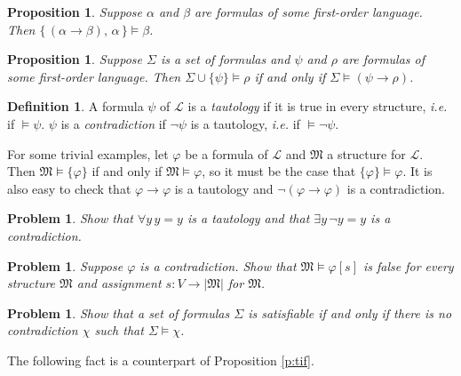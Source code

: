 \documentclass[12pt]{amsbook}
\theoremstyle{plain}
\newtheorem{prop}[thm]{Proposition}
\newtheorem{prob}[thm]{Problem}
\theoremstyle{definition}
\newtheorem{defn}{Definition}[chapter]
\theoremstyle{remark}
\begin{document}
\begin{prop} \label{p:inf}
Suppose $\alpha$ and $\beta$ are formulas of some first-order language.  Then $\{\, (\alpha \to \beta),\,  \alpha\, \} \models \beta$.
\end{prop}

\begin{prop} \label{p:six12}
Suppose $\Sigma$ is a set of formulas and $\psi$ and $\rho$ are formulas of some first-order language.  Then $\Sigma \cup \{\psi\} \models \rho$ if and only if $\Sigma \models (\psi \to \rho)$.
\end{prop}

\begin{defn}
A formula $\psi$ of $\mathcal{L}$ is a {\em tautology\/} if it is true in every structure,  {\em i.e.\/} if $\models \psi$.  $\psi$ is a {\em contradiction\/} if $\lnot \psi$ is a tautology,  {\em i.e.\/} if $\models \lnot \psi$.
\end{defn}

For some trivial examples,  let $\varphi$ be a formula of $\mathcal{L}$ and $\mathfrak{M}$ a structure for $\mathcal{L}$.  Then $\mathfrak{M} \models \{ \varphi \}$ if and only if $\mathfrak{M} \models \varphi$,  so it must be the case that $\{ \varphi \} \models \varphi$.  It is also easy to check that $\varphi \to \varphi$ is a tautology and $\lnot (\varphi \to \varphi)$ is a contradiction.

\begin{prob} \label{p:taut}
Show that $\forall y\, y = y$ is a tautology and that $\exists y\, \lnot y = y$ is a contradiction.
\end{prob}

\begin{prob} \label{p:cont}
Suppose $\varphi$ is a contradiction.  Show that $\mathfrak{M} \models \varphi [s]$ is false for every structure $\mathfrak{M}$ and assignment $s : V \to |\mathfrak{M}|$ for $\mathfrak{M}$.
\end{prob}

\begin{prob} \label{p:six13}
Show that a set of formulas $\Sigma$ is satisfiable if and only if there is no contradiction $\chi$ such that $\Sigma \models \chi$.
\end{prob}

The following fact is a counterpart of Proposition \ref{p:tif}.
\end{document}
